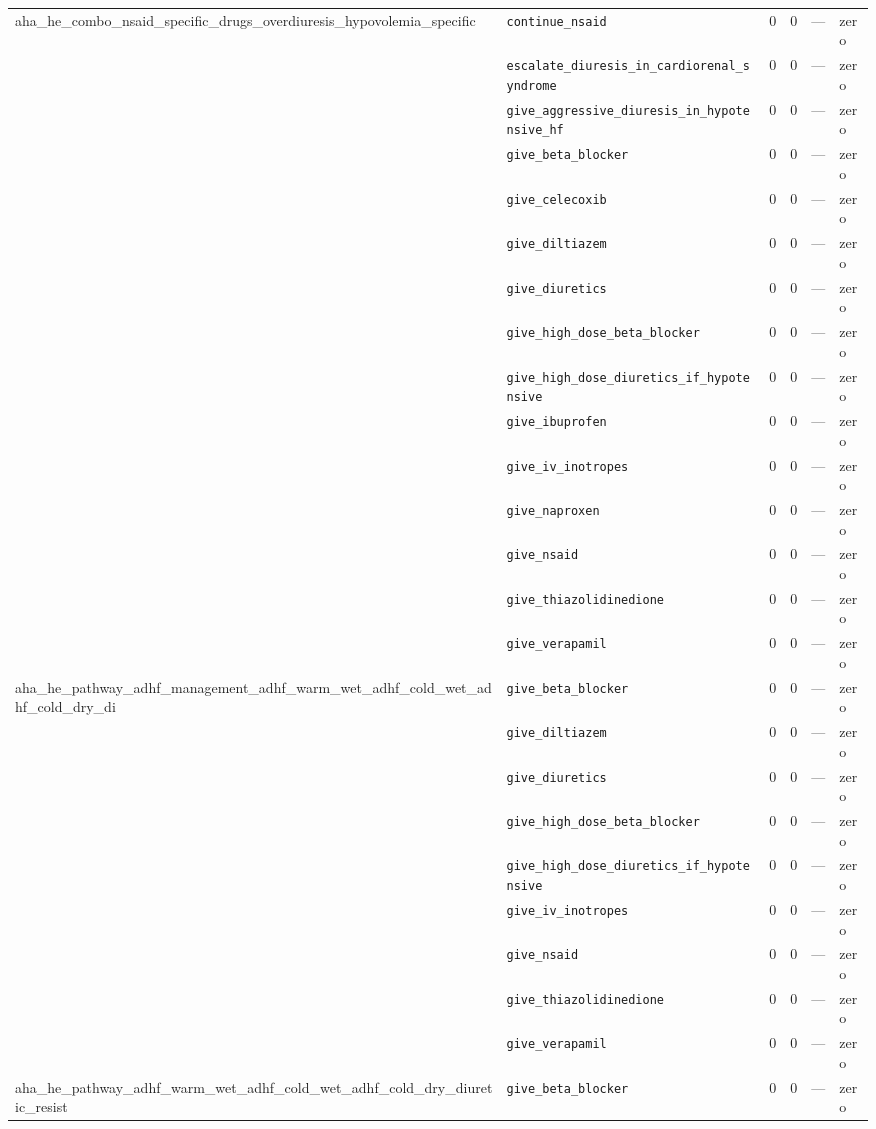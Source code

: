 \begin{table}[ht]
\begin{tabular}{llrrrl}
\midrule
aha\_he\_combo\_nsaid\_specific\_drugs\_overdiuresis\_hypovolemia\_specific & \texttt{continue\_nsaid} & 0 & 0 & — & zero \\
 & \texttt{escalate\_diuresis\_in\_cardiorenal\_syndrome} & 0 & 0 & — & zero \\
 & \texttt{give\_aggressive\_diuresis\_in\_hypotensive\_hf} & 0 & 0 & — & zero \\
 & \texttt{give\_beta\_blocker} & 0 & 0 & — & zero \\
 & \texttt{give\_celecoxib} & 0 & 0 & — & zero \\
 & \texttt{give\_diltiazem} & 0 & 0 & — & zero \\
 & \texttt{give\_diuretics} & 0 & 0 & — & zero \\
 & \texttt{give\_high\_dose\_beta\_blocker} & 0 & 0 & — & zero \\
 & \texttt{give\_high\_dose\_diuretics\_if\_hypotensive} & 0 & 0 & — & zero \\
 & \texttt{give\_ibuprofen} & 0 & 0 & — & zero \\
 & \texttt{give\_iv\_inotropes} & 0 & 0 & — & zero \\
 & \texttt{give\_naproxen} & 0 & 0 & — & zero \\
 & \texttt{give\_nsaid} & 0 & 0 & — & zero \\
 & \texttt{give\_thiazolidinedione} & 0 & 0 & — & zero \\
 & \texttt{give\_verapamil} & 0 & 0 & — & zero \\
\midrule
aha\_he\_pathway\_adhf\_management\_adhf\_warm\_wet\_adhf\_cold\_wet\_adhf\_cold\_dry\_di & \texttt{give\_beta\_blocker} & 0 & 0 & — & zero \\
 & \texttt{give\_diltiazem} & 0 & 0 & — & zero \\
 & \texttt{give\_diuretics} & 0 & 0 & — & zero \\
 & \texttt{give\_high\_dose\_beta\_blocker} & 0 & 0 & — & zero \\
 & \texttt{give\_high\_dose\_diuretics\_if\_hypotensive} & 0 & 0 & — & zero \\
 & \texttt{give\_iv\_inotropes} & 0 & 0 & — & zero \\
 & \texttt{give\_nsaid} & 0 & 0 & — & zero \\
 & \texttt{give\_thiazolidinedione} & 0 & 0 & — & zero \\
 & \texttt{give\_verapamil} & 0 & 0 & — & zero \\
\midrule
aha\_he\_pathway\_adhf\_warm\_wet\_adhf\_cold\_wet\_adhf\_cold\_dry\_diuretic\_resist & \texttt{give\_beta\_blocker} & 0 & 0 & — & zero \\

\end{tabular}
\end{table}
